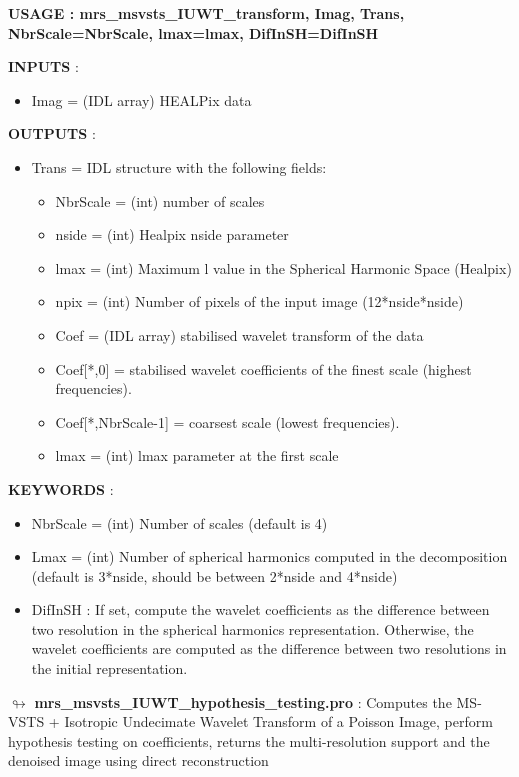 \begin{center}
 \bf{USAGE : mrs\_msvsts\_IUWT\_transform, Imag, Trans, NbrScale=NbrScale, lmax=lmax, DifInSH=DifInSH}
\end{center}

\textbf{INPUTS} :
\begin{itemize}
\item{Imag = (IDL array) HEALPix data}
\end{itemize}

\textbf{OUTPUTS} : 
\begin{itemize}
\item{Trans = IDL structure with the following fields:
\begin{itemize}
  \item NbrScale = (int) number of scales 
  \item nside = (int) Healpix nside parameter
  \item lmax = (int) Maximum l value in the Spherical Harmonic Space (Healpix)
  \item npix = (int) Number of pixels of the input image (12*nside*nside)
  \item Coef = (IDL array) stabilised wavelet transform of the data
  \item Coef[*,0] = stabilised wavelet coefficients of the finest scale (highest frequencies).
  \item Coef[*,NbrScale-1] = coarsest scale (lowest frequencies). 
  \item lmax = (int) lmax parameter at the first scale
\end{itemize} }
\end{itemize}

\textbf{KEYWORDS} :
\begin{itemize}
  \item NbrScale = (int) Number of scales (default is 4)
  \item Lmax = (int) Number of spherical harmonics computed in the decomposition (default is 3*nside, should be between 2*nside and 4*nside)
  \item DifInSH   : If set, compute the wavelet coefficients as the difference between two resolution in the spherical harmonics representation. Otherwise, the wavelet coefficients are computed as the difference between two resolutions in the initial representation.
\end{itemize}

\vspace{0.3cm}
$\looparrowright$ \textbf{mrs\_msvsts\_IUWT\_hypothesis\_testing.pro} :  Computes the MS-VSTS + Isotropic Undecimate Wavelet Transform of a Poisson Image, perform hypothesis testing on coefficients, returns the multi-resolution support and the denoised image using direct reconstruction

